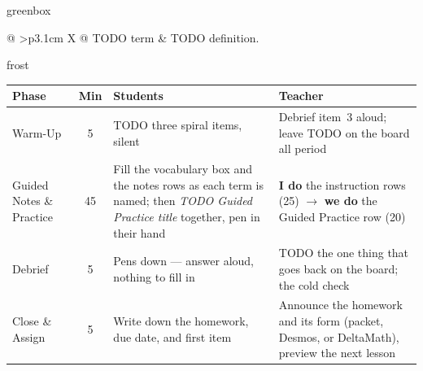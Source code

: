 \documentclass[10pt]{article}
\begin{document}
\boxguard[24]
\begin{skillbox}{greenbox}
\small
\renewcommand{\arraystretch}{1.35}
\begin{tabularx}{\linewidth}{@{} >{\bfseries}p{3.1cm} X @{}}
TODO term & TODO definition. \\
\end{tabularx}
\end{skillbox}

\begin{fixedskillbox}{frost}
\renewcommand{\arraystretch}{1.25}
\begin{tabularx}{\linewidth}{@{}l c X X@{}}
\textbf{Phase} & \textbf{Min} & \textbf{Students} & \textbf{Teacher} \\
\hline
Warm-Up & 5 & TODO three spiral items, silent & Debrief item~3 aloud; leave TODO on the board all period \\
Guided Notes \& Practice & 45 & Fill the vocabulary box and the notes rows as each term is named;
  then \emph{TODO Guided Practice title} together, pen in their hand & \textbf{I do} the
  instruction rows (25) $\to$ \textbf{we do} the Guided Practice row (20) \\
Debrief & 5 & Pens down --- answer aloud, nothing to fill in & TODO the one thing that goes back
  on the board; the cold check \\
Close \& Assign & 5 & Write down the homework, due date, and first item & Announce the
  homework and its form (packet, Desmos, or DeltaMath), preview the next lesson \\
\end{tabularx}
\end{fixedskillbox}
\end{document}

